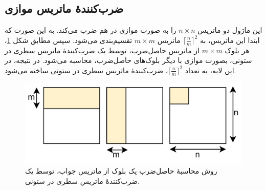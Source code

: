 \documentclass[conference]{IEEEtran-ModifiedForMVIP}
\begin{document}
\subsection{
    ضرب‌کنندهٔ ماتریس موازی
}


این ماژول دو ماتریس 
$n \times n$
را به صورت موازی در هم ضرب می‌کند. 
به این صورت که ابتدا این ماتریس، به 
$\lceil\frac{n}{m}\rceil^2$
ماتریس 
$m \times m$
تقسیم‌بندی می‌شود.
سپس مطابق شکل
\ref{fig:ParallelMatrix}،
هر بلوک
$m \times m$
از ماتریس حاصل‌ضرب، توسط یک ضرب‌کنندهٔ ماتریس سطری در ستونی، بصورت موازی با دیگر بلوک‌های حاصل‌ضرب، محاسبه می‌شود.
در نتیجه، در این لایه، به تعداد
$\lceil\frac{n}{m}\rceil^2$،
ضرب‌کنندهٔ ماتریس سطری در ستونی ساخته می‌شود.
\begin{figure}[t]
\centering
\includegraphics[width=1\linewidth]{Images/ParallelMatrix.png}
\caption{
\centering
روش محاسبهٔ حاصل‌ضرب یک بلوک از ماتریس جواب، توسط یک ضرب‌کنندهٔ ماتریس سطری در ستونی.
}\label{fig:ParallelMatrix}
\end{figure}
\end{document}
